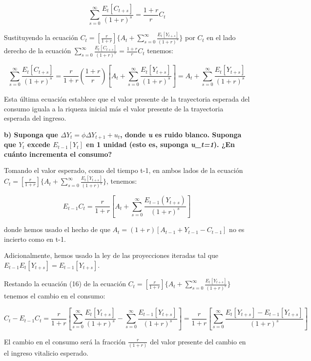 \documentclass[
]{article}
\begin{document}
\begin{equation}
\sum^\infty_{s=0}\frac{E_t[C_{t+s}]}{(1+r)^s}=\frac{1+r}{r}C_t
\end{equation}

Sustituyendo la ecuación
\(C_t=[\frac{r}{1+r}]\{A_t+\sum^\infty_{s=0}\frac{E_t[Y_{t+s}]}{(1+r)^s}\}\)
por \(C_t\) en el lado derecho de la ecuación
\(\sum^\infty_{s=0}\frac{E_t[C_{t+s}]}{(1+r)^s}=\frac{1+r}{r}C_t\)
tenemos:

\begin{equation}
\sum^\infty_{s=0}\frac{E_t[C_{t+s}]}{(1+r)^s}=\frac{r}{1+r}(\frac{1+r}{r})[A_t+\sum^\infty_{s=0}\frac{E_t[Y_{t+s}]}{(1+r)^s}]=A_t+\sum^\infty_{s=0}\frac{E_t[Y_{t+s}]}{(1+r)^s}
\end{equation}

Esta última ecuación establece que el valor presente de la trayectoria
esperada del consumo iguala a la riqueza inicial más el valor presente
de la trayectoria esperada del ingreso.

\textbf{b) Suponga que \(\Delta Y_t=\phi \Delta Y_{t+1}+u_t\), donde
\emph{u} es ruido blanco. Suponga que \(Y_t\) excede \(E_{t-1}[Y_t]\) en
1 unidad (esto es, suponga \emph{u\_t=1}). ¿En cuánto incrementa el
consumo?}

Tomando el valor esperado, como del tiempo t-1, en ambos lados de la
ecuación
\(C_t=[\frac{r}{1+r}]\{A_t+\sum^\infty_{s=0}\frac{E_t[Y_{t+s}]}{(1+r)^s}\}\),
tenemos:

\begin{equation}
E_{t-1}C_t=\frac{r}{1+r}[A_t+\sum^\infty_{s=0}\frac{E_{t-1}(Y_{t+s})}{(1+r)^s}]
\end{equation}

donde hemos usado el hecho de que \(A_t=(1+r)[A_{t-1}+Y_{t-1}-C_{t-1}]\)
no es incierto como en t-1.

Adicionalmente, hemos usado la ley de las proyecciones iteradas tal que
\(E_{t-1}E_{t}[Y_{t+s}]=E_{t-1}[Y_{t+s}]\).

Restando la ecuación (16) de la ecuación
\(C_t=[\frac{r}{1+r}]\{A_t+\sum^\infty_{s=0}\frac{E_t[Y_{t+s}]}{(1+r)^s}\}\)
tenemos el cambio en el consumo:

\begin{equation}
C_t-E_{t-1}C_t=\frac{r}{1+r}[\sum^\infty_{s=0}\frac{E_t[Y_{t+s}]}{(1+r)^s}-\sum^\infty_{s=0}\frac{E_{t-1}[Y_{t+s}]}{(1+r)^s}]=\frac{r}{1+r}[\sum^\infty_{s=0}\frac{E_t[Y_{t+s}]-E_{t-1}[Y_{t+s}]}{(1+r)^s}]
\end{equation}

El cambio en el consumo será la fracción \(\frac{r}{(1+r)}\) del valor
presente del cambio en el ingreso vitalicio esperado.
\end{document}
